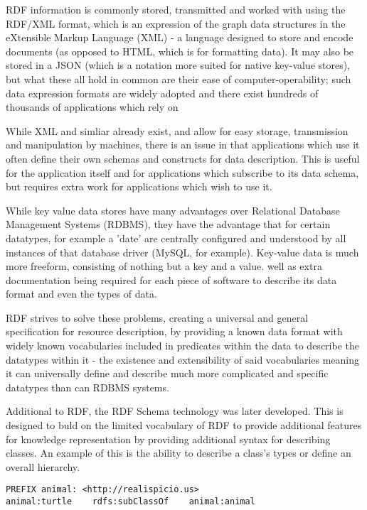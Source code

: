 \documentclass{article}
\begin{document}
RDF information is commonly stored, transmitted and worked with using the
RDF/XML format, which is an expression of the graph data structures in the
eXtensible Markup Language (XML) - a language designed to store and encode
documents (as opposed to HTML, which is for formatting data). It may also be
stored in a JSON (which is a notation more suited for native key-value stores),
but what these all hold in common are their ease of computer-operability; such
data expression formats are widely adopted and there exist hundreds of thousands
of applications which rely on 

While XML and simliar already exist, and allow for easy storage, transmission 
and manipulation by machines, there is an issue in that applications which use
it often define their own schemas and constructs for data description. This is
useful for the application itself and for applications which subscribe to its
data schema, but requires extra work for applications which wish to use it.

While key value data stores have many advantages over Relational Database
Management Systems (RDBMS), they have the advantage that for certain datatypes,
for example a 'date' are centrally configured and understood by all instances of
that database driver (MySQL, for example). Key-value data is much more freeform,
consisting of nothing but a key and a value. 
well as extra documentation being required for each piece of software to
describe its data format and even the types of data. 

RDF strives to solve these problems, creating a universal and general
specification for resource description, by providing a known data format with
widely known vocabularies included in predicates within the data to describe 
the datatypes within it - the existence and extensibility of said vocabularies 
meaning it can universally define and describe much more complicated and 
specific datatypes than can RDBMS systems.

Additional to RDF, the RDF Schema technology was later developed. This is
designed to buld on the limited vocabulary of RDF to provide additional features
for knowledge representation by providing additional syntax for describing
classes. An example of this is the ability to describe a class's types or define
an overall hierarchy.

\begin{lstlisting}
PREFIX animal: <http://realispicio.us>
animal:turtle    rdfs:subClassOf    animal:animal
\end{lstlisting}
\end{document}
